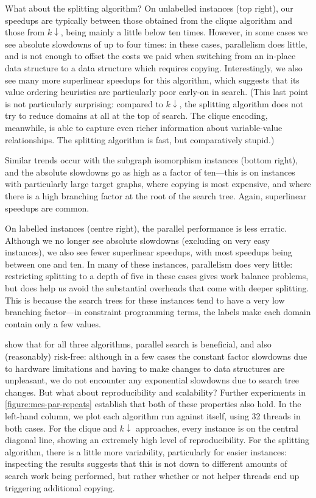 \documentclass{llncs}
\begin{document}
What about the splitting algorithm? On unlabelled instances (top right), our speedups are typically
between those obtained from the clique algorithm and those from $k{\downarrow}$, being mainly a
little below ten times. However, in some cases we see absolute slowdowns of up to four times: in
these cases, parallelism does little, and is not enough to offset the costs we paid when switching
from an in-place data structure to a data structure which requires copying. Interestingly, we also
see many more superlinear speedups for this algorithm, which suggests that its value ordering
heuristics are particularly poor early-on in search. (This last point is not particularly
surprising: compared to $k{\downarrow}$, the splitting algorithm does not try to reduce domains at
all at the top of search. The clique encoding, meanwhile, is able to capture even richer information
about variable-value relationships. The splitting algorithm is fast, but comparatively stupid.)

Similar trends occur with the subgraph isomorphism instances (bottom right), and the absolute
slowdowns go as high as a factor of ten---this is on instances with particularly large
target graphs, where copying is most expensive, and where there is a high branching factor at the
root of the search tree. Again, superlinear speedups are common.

On labelled instances (centre right), the parallel performance is less erratic. Although we no
longer see absolute slowdowns (excluding on very easy instances), we also see fewer superlinear
speedups, with most speedups being between one and ten. In many of these instances, parallelism
does very little: restricting splitting to a depth of five in these cases gives work balance
problems, but does help us avoid the substantial overheads that come with deeper splitting. This is
because the search trees for these instances tend to have a very low branching factor---in
constraint programming terms, the labels make each domain contain only a few values.

 show that for all three
algorithms, parallel search is beneficial, and also (reasonably) risk-free: although in a few cases the
constant factor slowdowns due to hardware limitations and having to make changes to data structures
are unpleasant, we do not encounter any exponential slowdowns due to search tree changes. But what
about reproducibility and scalability? Further experiments in \cref{figure:mcs-par-repeats}
establish that both of these properties also hold. In the left-hand column, we plot each algorithm
run against itself, using 32 threads in both cases. For the clique and $k{\downarrow}$ approaches,
every instance is on the central diagonal line, showing an extremely high level of reproducibility.
For the splitting algorithm, there is a little more variability, particularly for easier instances:
inspecting the results suggests that this is not down to different amounts of search work being
performed, but rather whether or not helper threads end up triggering additional copying.
\end{document}
